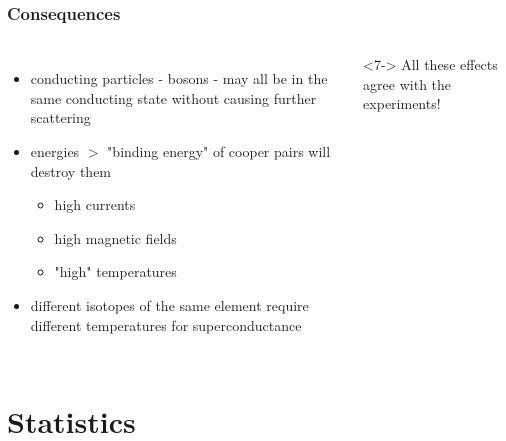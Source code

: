 \documentclass{beamer}
\begin{document}
\begin{frame} \frametitle{Consequences}
\begin{columns}
	\begin{itemize}[<+->]
		\item conducting particles - bosons - may all be in the same conducting state without causing further scattering
		\item energies $>$ "binding energy" of cooper pairs will destroy them
		\begin{itemize}
			\item high currents
			\item high magnetic fields
			\item "high" temperatures %
		\end{itemize}
		\item different isotopes of the same element require different temperatures for superconductance
	\end{itemize} 
\begin{block}{ }<7->
	All these effects agree with the experiments!
\end{block}
\end{columns}
\end{frame}

\section{Statistics} %
\end{document}
